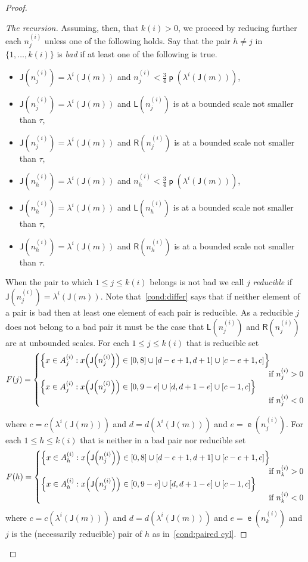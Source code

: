 \documentclass[10pt]{amsart}
\theoremstyle{definition}\newtheorem{defi}[theo]{Definition}\newtheorem{rema}[theo]{Remark}\newtheorem{exam}[theo]{Example}\newtheorem{exem}[theo]{Example}\newtheorem{nota}[theo]{Notation}
\DeclareMathOperator{\lst}{\mathsf{e}}
\DeclareMathOperator{\p}{\mathsf{p}}
\newcommand{\lft}{\mathsf{L}}
\newcommand{\rht}{\mathsf{R}}
\newcommand{\scl}{\mathsf{J}}
\let\originalleft\left
\let\originalright\right
\renewcommand{\left}{\mathopen{}\mathclose\bgroup\originalleft}
\renewcommand{\right}{\aftergroup\egroup\originalright}
\begin{document}
\begin{proof}
\begin{proof}[{The recursion}]
Assuming, then, that $k(i) > 0$, we proceed by reducing further each $n^{(i)}_j$ unless one of the following holds. Say that the pair $h \ne j$ in $\{1,\dots,k(i) \}$ is
\emph{bad} if at least one of the following is true.
\begin{itemize}
\item $\scl(n_j^{(i)}) = \lambda^i(\scl(m))$ and $n_j^{(i)} < \frac{3}{4} \p(\lambda^i(\scl(m)))$,
\item $\scl(n_j^{(i)}) = \lambda^i(\scl(m))$ and $\lft(n_j^{(i)})$ is at a bounded scale not smaller than $\tau$,
\item $\scl(n_j^{(i)}) = \lambda^i(\scl(m))$ and $\rht(n_j^{(i)})$ is at a bounded scale not smaller than $\tau$,
\item $\scl(n_h^{(i)}) = \lambda^i(\scl(m))$ and $n_h^{(i)}<\frac{3}{4} \p(\lambda^i(\scl(m)))$,
\item $\scl(n_h^{(i)}) = \lambda^i(\scl(m))$ and $\lft(n_h^{(i)})$ is at a bounded scale not smaller than $\tau$,
\item $\scl(n_h^{(i)}) = \lambda^i(\scl(m))$ and $\rht(n_h^{(i)})$ is at a bounded scale not smaller than $\tau$.
\end{itemize}
When the pair to which $1 \le j \le k(i)$ belongs is not bad we call $j$
\emph{reducible} if $\scl(n_j^{(i)}) = \lambda^{i}(\scl(m))$. Note that~\eqref{cond:differ} says that if neither element of a pair is bad then at least one element of each pair is reducible. As a reducible $j$ does not belong to a bad pair it must be the case that $\lft(n^{(i)}_j)$ and $\rht(n^{(i)}_j)$ are at unbounded scales. For each $1 \le j \le k(i)$ that is reducible set
\[
F(j) =
\begin{cases}
\left\{ x \in A^{(i)}_j : x\left(\scl\left(n^{(i)}_j\right)\right) \in [0,8] \cup [d-e+1, d+1] \cup [c-e+1, c] \right\}\\
&
\mkern-20mu\text{if } n^{(i)}_j>0
\\
\left\{ x \in A^{(i)}_j : x\left(\scl\left(n^{(i)}_j\right)\right) \in [0,9-e] \cup [d,d+1-e] \cup [c-1,c] \right\}\\
&
\mkern-20mu\text{if } n^{(i)}_j < 0
\end{cases}
\]
\pagebreak{}

\noindent
where $c = c(\lambda^i(\scl(m)))$ and $d = d(\lambda^i(\scl(m)))$ and $e = \lst(n^{(i)}_j)$. For each $1 \le h \le k(i)$ that is neither in a bad pair nor reducible set
\[
F(h) =
\begin{cases}
\left\{ x \in A^{(i)}_h : x\left(\scl\left(n^{(i)}_j\right)\right) \in [0,8] \cup [d-e+1, d+1] \cup [c-e+1, c] \right\} \\
&
\mkern-20mu\text{if } n^{(i)}_k > 0
\\
\left\{ x \in A^{(i)}_h : x\left(\scl\left(n^{(i)}_j\right)\right) \in [0,9-e] \cup [d,d+1-e] \cup [c-1,c] \right\}\\
&
\mkern-20mu\text{if } n^{(i)}_k < 0
\end{cases}
\]
where $c = c(\lambda^i(\scl(m)))$ and $d = d(\lambda^i(\scl(m)))$ and $e = \lst(n^{(i)}_k)$ and $j$ is the (necessarily reducible) pair of $h$ as in~\eqref{cond:paired cyl}.


\end{proof}
\end{proof}
\end{document}
